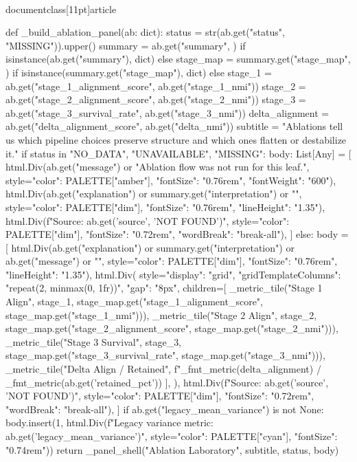 \\documentclass[11pt]{article}
\begin{document}
\begin{CodeBlock}
{{{{{{{{def _build_ablation_panel(ab: dict):
    status = str(ab.get("status", "MISSING")).upper()
    summary = ab.get("summary", {}) if isinstance(ab.get("summary"), dict) else {}
    stage_map = summary.get("stage_map", {}) if isinstance(summary.get("stage_map"), dict) else {}
    stage_1 = ab.get("stage_1_alignment_score", ab.get("stage_1_nmi"))
    stage_2 = ab.get("stage_2_alignment_score", ab.get("stage_2_nmi"))
    stage_3 = ab.get("stage_3_survival_rate", ab.get("stage_3_nmi"))
    delta_alignment = ab.get("delta_alignment_score", ab.get("delta_nmi"))
    subtitle = "Ablations tell us which pipeline choices preserve structure and which ones flatten or destabilize it."
    if status in {"NO_DATA", "UNAVAILABLE", "MISSING"}:
        body: List[Any] = [
            html.Div(ab.get("message") or "Ablation flow was not run for this leaf.", style={"color": PALETTE["amber"], "fontSize": "0.76rem", "fontWeight": "600"}),
            html.Div(ab.get("explanation") or summary.get("interpretation") or "", style={"color": PALETTE["dim"], "fontSize": "0.76rem", "lineHeight": "1.35"}),
            html.Div(f"Source: {ab.get('source', 'NOT FOUND')}", style={"color": PALETTE["dim"], "fontSize": "0.72rem", "wordBreak": "break-all"}),
        ]
    else:
        body = [
            html.Div(ab.get("explanation") or summary.get("interpretation") or ab.get("message") or "", style={"color": PALETTE["dim"], "fontSize": "0.76rem", "lineHeight": "1.35"}),
            html.Div(
                style={"display": "grid", "gridTemplateColumns": "repeat(2, minmax(0, 1fr))", "gap": "8px"},
                children=[
                    _metric_tile("Stage 1 Align", stage_1, stage_map.get("stage_1_alignment_score", stage_map.get("stage_1_nmi"))),
                    _metric_tile("Stage 2 Align", stage_2, stage_map.get("stage_2_alignment_score", stage_map.get("stage_2_nmi"))),
                    _metric_tile("Stage 3 Survival", stage_3, stage_map.get("stage_3_survival_rate", stage_map.get("stage_3_nmi"))),
                    _metric_tile("Delta Align / Retained", f"{_fmt_metric(delta_alignment)} / {_fmt_metric(ab.get('retained_pct'))}%
                ],
            ),
            html.Div(f"Source: {ab.get('source', 'NOT FOUND')}", style={"color": PALETTE["dim"], "fontSize": "0.72rem", "wordBreak": "break-all"}),
        ]
    if ab.get("legacy_mean_variance") is not None:
        body.insert(1, html.Div(f"Legacy variance metric: {ab.get('legacy_mean_variance')}", style={"color": PALETTE["cyan"], "fontSize": "0.74rem"}))
    return _panel_shell("Ablation Laboratory", subtitle, status, body)


}}}}}}}}
\end{CodeBlock}
\end{document}
